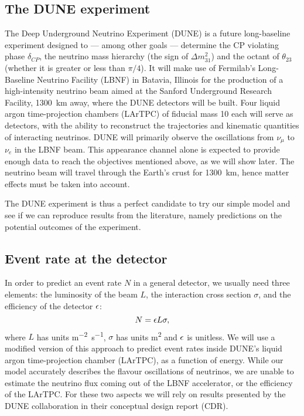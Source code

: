 \subsection{The DUNE experiment}
The Deep Underground Neutrino Experiment (DUNE) is a future long-baseline
experiment designed to --- among other goals --- determine the CP violating phase
$\delta_{CP}$, the neutrino mass hierarchy (the sign of $\Delta m^2_{31}$) and
the octant of $\theta_{23}$ (whether it is greater or less than 
$\pi/4$)\cite{cdr}. 
It will make use of Fermilab's Long-Baseline Neutrino Facility (LBNF) in Batavia,
Illinois for the production of a high-intensity neutrino beam aimed at the
Sanford Underground Research Facility, \SI{1300}{\km} away, where the DUNE
detectors will be built.
Four liquid argon time-projection chambers (LArTPC) of fiducial mass
\SI{10}{\kt} each will serve as detectors, with the ability to reconstruct the
trajectories and kinematic quantities of interacting neutrinos.
DUNE will primarily observe the oscillations from $\nu_\mu$ to $\nu_e$ in the
LBNF beam. This appearance channel alone is expected to provide enough data to
reach the objectives mentioned above, as we will show later.
The neutrino beam will travel through the Earth's crust for \SI{1300}{\km},
hence matter effects must be taken into account.

The DUNE experiment is thus a perfect candidate to try our simple model and see if
we can reproduce results from the literature, namely predictions on the
potential outcomes of the experiment.

\subsection{Event rate at the detector}
In order to predict an event rate $N$ in a general detector, we usually need three
elements: the luminosity of the beam $L$, the interaction cross section $\sigma$, and the
efficiency of the detector $\epsilon$:
\begin{equation}N = \epsilon L \sigma,\label{eq:rate}\end{equation}
where $L$ has units \si{\m^{-2} \s^{-1}}, $\sigma$ has units \si{\m^2} and
$\epsilon$ is unitless.
We will use a modified version of this approach to predict event rates inside
DUNE's liquid argon time-projection chamber (LArTPC), as a function of
energy. While our model
accurately describes the flavour oscillations of neutrinos, we are unable to
estimate the neutrino flux coming out of the LBNF accelerator, or the
efficiency of the LArTPC. For these two aspects we will rely on results
presented by the DUNE collaboration in their conceptual design report (CDR).

